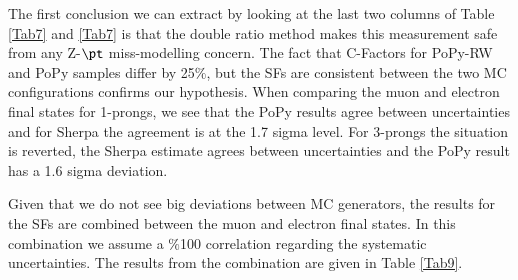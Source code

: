 The first conclusion we can extract by looking at the last two columns of Table \ref{Tab7} and \ref{Tab7} is that the double ratio method makes this measurement safe from any Z-$\pt$ miss-modelling concern. The fact that C-Factors for PoPy-RW and PoPy samples differ by 25$\%$, but the SFs are consistent between the two MC configurations confirms our hypothesis. When comparing the muon and electron final states for 1-prongs, we see that the PoPy results agree between uncertainties and for Sherpa the agreement is at the 1.7 sigma level. For 3-prongs the situation is reverted, the Sherpa estimate agrees between uncertainties and the PoPy result has a 1.6 sigma deviation.

Given that we do not see big deviations between MC generators, the results for the SFs are combined between the muon and electron final states. In this combination we assume a $\%$100 correlation regarding the systematic uncertainties. The results from the combination are given in Table \ref{Tab9}.
\begin{table}[]
\end{table} 



